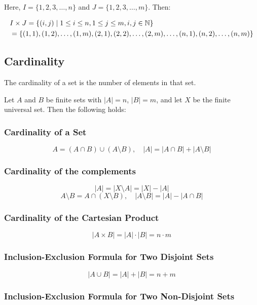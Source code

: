 Here, \( I = \{ 1, 2, 3, \dots, n \} \) and \( J = \{ 1, 2, 3, \dots, m \} \). Then:

\begin{align*}
&I \times J = \{ (i, j) \mid 1 \leq i \leq n, 1 \leq j \leq m, i, j \in \mathbb{N} \} \\
&= \{ (1, 1), (1, 2), \dots, (1, m), (2, 1), (2, 2), \dots, (2, m), \dots, (n, 1), (n, 2), \dots, (n, m) \}
\end{align*}

\subsection{Cardinality}

The cardinality of a set is the number of elements in that set.
\vspace{\baselineskip}

Let \(A\) and \(B\) be finite sets with \( |A| = n \), \( |B| = m \), and let \(X\) be the finite 
universal set. Then the following holds:

\subsubsection{Cardinality of a Set}

\[
	A = (A \cap B) \cup (A \setminus B), \quad |A| = |A \cap B| + |A \setminus B|
\]

\subsubsection{Cardinality of the complements}

\[
	|A| = |X \setminus A| = |X| - |A|
\]
\[
	A \setminus B = A \cap (X \setminus B), \quad |A \setminus B| = |A| - |A \cap B|
\]

\subsubsection{Cardinality of the Cartesian Product}

\[
	|A \times B| = |A| \cdot |B| = n \cdot m
\]

\subsubsection{Inclusion-Exclusion Formula for Two Disjoint Sets}

\[
	|A \cup B| = |A| + |B| = n + m
\]

\subsubsection{Inclusion-Exclusion Formula for Two Non-Disjoint Sets}

